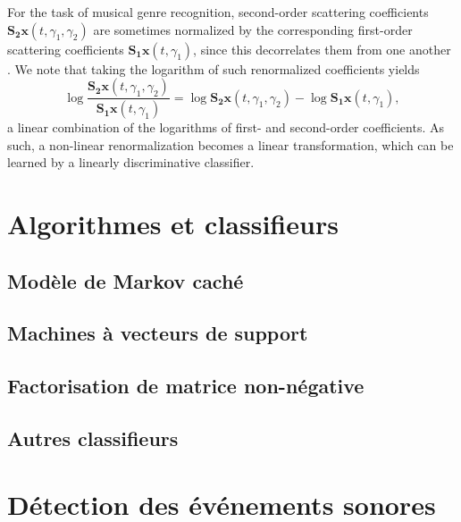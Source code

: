 For the task of musical genre recognition, second-order scattering coefficients $\mathbf{S_2}\boldsymbol{x}(t,\gamma_1,\gamma_2)$ are sometimes normalized by the corresponding first-order scattering coefficients $\mathbf{S_1}\boldsymbol{x}(t,\gamma_1)$, since this decorrelates them from one another \cite{Anden2014}.
We note that taking the logarithm of such renormalized coefficients yields
\begin{equation}
\log \dfrac{\mathbf{S_2}\boldsymbol{x}(t,\gamma_1,\gamma_2)}{\mathbf{S_1}\boldsymbol{x}(t,\gamma_1)} =
\log \mathbf{S_2}\boldsymbol{x}(t, \gamma_1, \gamma_2) -
\log \mathbf{S_1}\boldsymbol{x}(t, \gamma_1),
\end{equation}
\ie a linear combination of the logarithms of first- and second-order coefficients.
As such, a non-linear renormalization becomes a linear transformation, which can be learned by a linearly discriminative classifier.

\section{Algorithmes et classifieurs}

\subsection{Modèle de Markov caché}
\label{sec:ch6_hmm}


\subsection{Machines à vecteurs de support}
\label{sec:ch6_svm}

\subsection{Factorisation de matrice non-négative}
\label{sec:ch6_nmf}

\subsection{Autres classifieurs}
\label{sec:ch6_autresAlgo}


\section{Détection des événements sonores}
\label{sec:ch6_AED}


